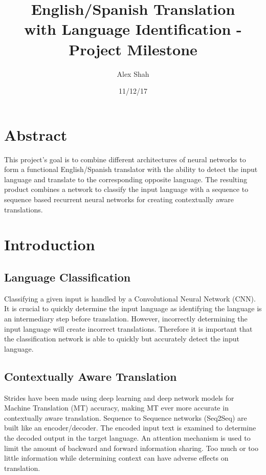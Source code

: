 \documentclass[10pt,a4paper]{report}
\begin{document}
\title{English/Spanish Translation \\ with Language Identification - \\ Project Milestone}
\author{Alex Shah}
\date{11/12/17}

\maketitle

\section{Abstract}
This project's goal is to combine different architectures of neural networks to form a functional English/Spanish translator with the ability to detect the input language and translate to the corresponding opposite language. The resulting product combines a network to classify the input language with a sequence to sequence based recurrent neural networks for creating contextually aware translations.
\clearpage

\section{Introduction}

\subsection{Language Classification}
Classifying a given input is handled by a Convolutional Neural Network (CNN). It is crucial to quickly determine the input language as identifying the language is an intermediary step before translation. However, incorrectly determining the input language will create incorrect translations. Therefore it is important that the classification network is able to quickly but accurately detect the input language.

\subsection{Contextually Aware Translation}
Strides have been made using deep learning and deep network models for Machine Translation (MT) accuracy, making MT ever more accurate in contextually aware translation. Sequence to Sequence networks (Seq2Seq) are built like an encoder/decoder. The encoded input text is examined to determine the decoded output in the target language. An attention mechanism is used to limit the amount of backward and forward information sharing. Too much or too little information while determining context can have adverse effects on translation. 
\end{document}
